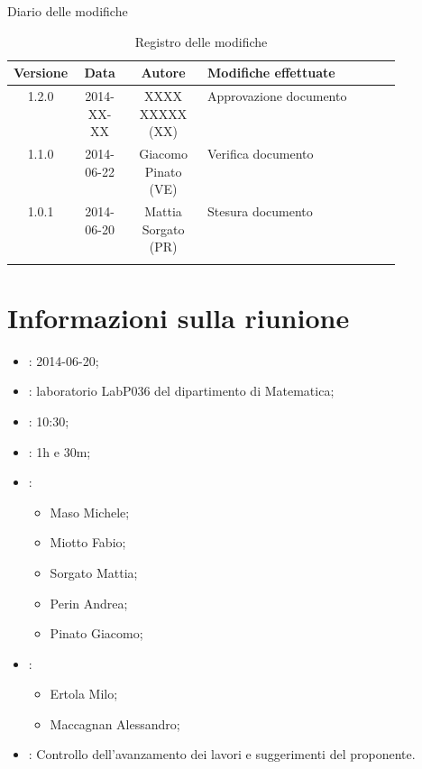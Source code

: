 
\newpage
Diario delle modifiche
\begin{center}
\begin{longtable}{|c|c|c|p{0.5\linewidth}|}
\toprule
\textbf{Versione} & \textbf{Data} & \textbf{Autore} & \textbf{Modifiche effettuate}\\


\midrule
1.2.0 & 2014-XX-XX & XXXX XXXXX (XX) & Approvazione documento \\	%
\midrule
1.1.0 & 2014-06-22 & Giacomo Pinato (VE) & Verifica documento \\		%
\midrule
1.0.1 & 2014-06-20 & Mattia Sorgato (PR) & Stesura documento \\

\bottomrule
\caption{Registro delle modifiche}
\label{tab:changelog}
\end{longtable}
\end{center}

\newpage
\tableofcontents


\newpage
\section{Informazioni sulla riunione}%
\label{1.0}
\begin{itemize}
\item {}: 2014-06-20;
\item {}: laboratorio LabP036 del dipartimento di Matematica;
\item {}: 10:30;
\item {}: 1h e 30m;
\item {}: \NomeGruppo{}
\begin{itemize}
\item Maso Michele;
\item Miotto Fabio;
\item Sorgato Mattia;
\item Perin Andrea;
\item Pinato Giacomo;
\end{itemize}
\item {}: \Prop{}
\begin{itemize}
\item Ertola Milo;
\item Maccagnan Alessandro;
\end{itemize}
\item {}: Controllo dell'avanzamento dei lavori e suggerimenti del proponente.
\end{itemize}

